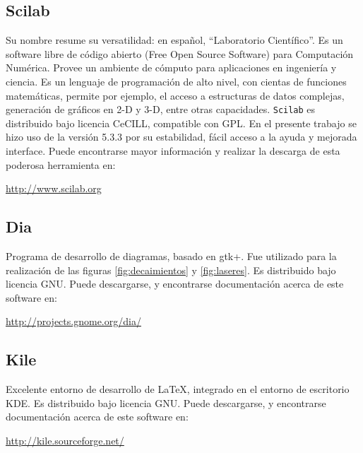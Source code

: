 \subsection{Scilab}\qquad Su nombre resume su versatilidad: en espa\~nol, ``Laboratorio Cient\'ifico''. Es un software libre de c\'odigo abierto (Free Open Source Software) para Computaci\'on Num\'erica. Provee un ambiente de c\'omputo para aplicaciones en ingenier\'ia y ciencia. Es un lenguaje de programaci\'on de alto nivel, con cientas de funciones matem\'aticas, permite por ejemplo, el acceso a estructuras de datos complejas, generaci\'on de gr\'aficos en 2-D y 3-D, entre otras capacidades. \verb|Scilab| es distribuido bajo licencia CeCILL, compatible con GPL. En el presente trabajo se hizo uso de la versi\'on 5.3.3 por su estabilidad, f\'acil acceso a la ayuda y mejorada interface. Puede encontrarse mayor informaci\'on y realizar la descarga de esta poderosa herramienta en:
\begin{center}
\url{http://www.scilab.org}\\
\end{center}

\subsection{Dia} \qquad Programa de desarrollo de diagramas, basado en gtk+. Fue utilizado para la realizaci\'on de las figuras \ref{fig:decaimientos}  y \ref{fig:laseres}. Es distribuido bajo licencia GNU. Puede descargarse, y encontrarse documentaci\'on acerca de este software en:
\begin{center}
\url{http://projects.gnome.org/dia/}\\
\end{center}

\subsection{Kile}\qquad Excelente entorno de desarrollo de \LaTeX, integrado en el entorno de escritorio KDE. Es distribuido bajo licencia GNU. Puede descargarse, y encontrarse documentaci\'on acerca de este software en:
\begin{center}
\url{http://kile.sourceforge.net/}\\
\end{center}